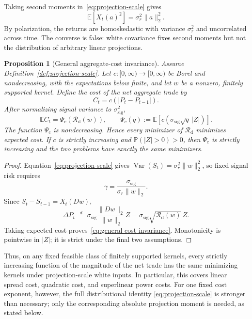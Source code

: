 \documentclass[11pt]{amsart}
\newtheorem{proposition}[theorem]{Proposition}
\theoremstyle{definition}
\theoremstyle{remark}
\newcommand{\Rcal}{\mathcal R}
\begin{document}
Taking second moments in~\eqref{eq:projection-scale} gives
\[
 \mathbb E[X_t(a)^2]=\sigma_r^2\|a\|_2^2.
\]
By polarization, the returns are homoskedastic with variance $\sigma_r^2$
and uncorrelated across time. The converse is false: white covariance fixes
second moments but not the distribution of arbitrary linear projections.

\begin{proposition}[General aggregate-cost invariance]
\label{prop:general-cost-invariance}
\leavevmode\newline
Assume Definition~\ref{def:projection-scale}. Let
$c:[0,\infty)\to[0,\infty)$ be Borel and nondecreasing, with the expectations
below finite, and let $w$ be a nonzero, finitely supported kernel. Define the
cost of the net aggregate trade by
\[
 C_t=c(|P_t-P_{t-1}|).
\]
After normalizing signal variance to $\sigma_{\mathrm{sig}}^2$,
\begin{equation}\label{eq:general-cost-invariance}
 \mathbb E C_t
 =\Psi_c\!\left(\Rcal_{\mathrm d}(w)\right),
 \qquad
 \Psi_c(q):=\mathbb E\!
 \left[c\!\left(\sigma_{\mathrm{sig}}\sqrt q\,|Z|\right)\right].
\end{equation}
The function $\Psi_c$ is nondecreasing. Hence every minimizer of
$\Rcal_{\mathrm d}$ minimizes expected cost. If $c$ is strictly increasing
and $\mathbb P(|Z|>0)>0$, then $\Psi_c$ is strictly increasing and the two
problems have exactly the same minimizers.
\end{proposition}
\begin{proof}
Equation~\eqref{eq:projection-scale} gives
$\operatorname{Var}(S_t)=\sigma_r^2\|w\|_2^2$, so fixed signal risk requires
\[
 \gamma=\frac{\sigma_{\mathrm{sig}}}{\sigma_r\|w\|_2}.
\]
Since $S_t-S_{t-1}=X_t(Dw)$,
\[
 \Delta P_t
 \ \overset d=\
 \sigma_{\mathrm{sig}}\frac{\|Dw\|_2}{\|w\|_2}Z
 =\sigma_{\mathrm{sig}}\sqrt{\Rcal_{\mathrm d}(w)}\,Z.
\]
Taking expected cost proves~\eqref{eq:general-cost-invariance}. Monotonicity
is pointwise in $|Z|$; it is strict under the final two assumptions.
\end{proof}

Thus, on any fixed feasible class of finitely supported kernels, every strictly increasing
function of the magnitude of the net trade has the same minimizing kernels
under projection-scale white inputs. In particular,
this covers linear spread cost, quadratic cost, and superlinear power costs.
For one fixed cost exponent, however, the full distributional identity
\eqref{eq:projection-scale} is stronger than necessary; only the corresponding
absolute projection moment is needed, as stated below.
\end{document}
